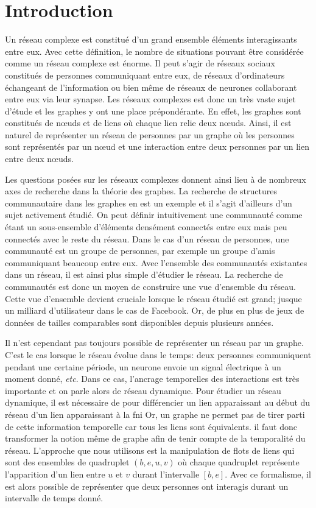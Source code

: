 
\chapter{Introduction}

Un réseau complexe est constitué d'un grand ensemble éléments interagissants entre eux.
Avec cette définition, le nombre de situations pouvant être considérée comme un réseau complexe est énorme.
Il peut s'agir de réseaux sociaux constitués de personnes communiquant entre eux, de réseaux d'ordinateurs échangeant de l'information ou bien même de réseaux de neurones collaborant entre eux via leur synapse.
Les réseaux complexes est donc un très vaste sujet d'étude et les graphes y ont une place prépondérante.
En effet, les graphes sont constitués de n\oe uds et de liens où chaque lien relie deux n\oe uds.
Ainsi, il est naturel de représenter un réseau de personnes par un graphe où les personnes sont représentés par un n\oe ud et une interaction entre deux personnes par un lien entre deux n\oe uds.

Les questions posées sur les réseaux complexes donnent ainsi lieu à de nombreux axes de recherche dans la théorie des graphes.
La recherche de structures communautaire dans les graphes en est un exemple et il s'agit d'ailleurs d'un sujet activement étudié.
On peut définir intuitivement une communauté comme étant un sous-ensemble d’éléments densément connectés entre eux mais peu connectés avec le reste du réseau.
Dans le cas d'un réseau de personnes, une communauté est un groupe de personnes, par exemple un groupe d'amis communiquant beaucoup entre eux.
Avec l'ensemble des communautés existantes dans un réseau, il est ainsi plus simple d'étudier le réseau.
La recherche de communautés est donc un moyen de construire une vue d'ensemble du réseau.
Cette vue d'ensemble devient cruciale lorsque le réseau étudié est grand; jusque un milliard d'utilisateur dans le cas de Facebook.
Or, de plus en plus de jeux de données de tailles comparables sont disponibles depuis plusieurs années.


Il n'est cependant pas toujours possible de représenter un réseau par un graphe.
C'est le cas lorsque le réseau évolue dans le temps: deux personnes communiquent pendant une certaine période, un neurone envoie un signal électrique à un moment donné, \emph{etc}.
Dans ce cas, l'ancrage temporelles des interactions est très importante et on parle alors de réseau dynamique.
Pour étudier un réseau dynamique, il est nécessaire de pour différencier un lien apparaissant au début du réseau d'un lien apparaissant à la fni
Or, un graphe ne permet pas de tirer parti de cette information temporelle car tous les liens sont équivalents. 
il faut donc transformer la notion même de graphe afin de tenir compte de la temporalité du réseau.
L'approche que nous utilisons est la manipulation de flots de liens qui sont des ensembles de quadruplet $(b, e, u, v)$ où chaque quadruplet représente l’apparition d’un lien entre $u$ et $v$ durant l'intervalle $[b,e]$.
Avec ce formalisme, il est alors possible de représenter que deux personnes ont interagis durant un intervalle de temps donné.


